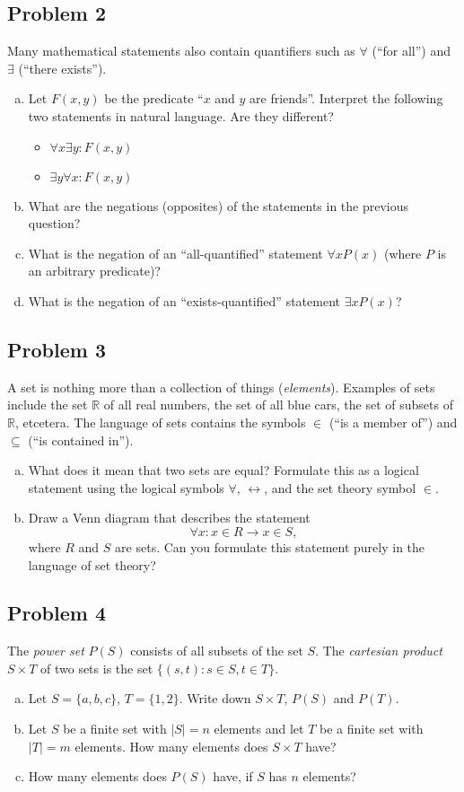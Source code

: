 \documentclass{amsart}
\newcommand{\R}{\mathbb{R}}
\theoremstyle{definition} \newtheorem*{definition}{Definition}
\theoremstyle{remark} \newtheorem*{ex}{Example}
\begin{document}
 \subsection*{Problem 2}
Many mathematical statements also contain quantifiers such as $\forall$ (``for all'') and $\exists$ (``there exists'').\begin{enumerate}[a)]
\item Let $F(x,y)$ be the predicate ``$x$ and $y$ are friends''. Interpret the following two statements in natural language. Are they different?\begin{itemize}\item $\forall x\exists y : F(x,y)$\item $\exists y \forall x : F(x,y)$\end{itemize}
\item What are the negations (opposites) of the statements in the previous question?
\item What is the negation of an ``all-quantified'' statement $\forall x P(x)$ (where $P$ is an arbitrary predicate)? 
\item What is the negation of an ``exists-quantified'' statement $\exists x P(x)$? 
\end{enumerate}

\subsection*{Problem 3}
A set is nothing more than a collection of things ({\em elements}). Examples of sets include the set $\R$ of all real numbers, the set of all blue cars, the set of subsets of $\R$, etcetera. The language of sets contains the symbols $\in$ (``is a member of'') and $\subseteq$ (``is contained in'').
\begin{enumerate}[a)]
\item What does it mean that two sets are equal? Formulate this as a logical statement using the logical symbols $\forall$, $\leftrightarrow$, and the set theory symbol $\in$.
\item Draw a Venn diagram that describes the statement $$\forall x : x\in R \to x\in S,$$ where $R$ and $S$ are sets. Can you formulate this statement purely in the language of set theory?
\end{enumerate}

\subsection*{Problem 4}
The {\em power set} $P(S)$ consists of all subsets of the set $S$. The {\em cartesian product} $S\times T$ of two sets is the set $\{(s,t): s\in S, t\in T\}$.
\begin{enumerate}[a)]
\item Let $S=\{a,b,c\}$, $T=\{1,2\}$. Write down $S\times T$, $P(S)$ and $P(T)$.
\item Let $S$ be a finite set with $|S|=n$ elements and let $T$ be a finite set with $|T|=m$ elements. How many elements does $S\times T$ have?
\item How many elements does $P(S)$ have, if $S$ has $n$ elements?  
\end{enumerate}
\end{document}
